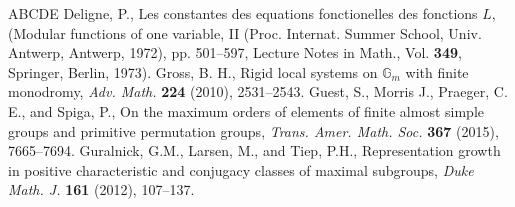 \documentclass[11pt]{amsart}
\theoremstyle{plain}
\theoremstyle{definition}
\numberwithin{thm}{section}
\numberwithin{equation}{thm}
\newcommand{\G}{{\mathbb G}}
\newcommand{\0}{\emptyset}
\begin{document}
\begin{thebibliography}{ABCDE}
\medskip
{}Deligne, P., Les constantes des equations fonctionelles des fonctions $L$, (Modular functions of one variable, II (Proc. Internat. Summer School, Univ. Antwerp, Antwerp, 1972), pp. 501--597, Lecture Notes in Math., Vol. {\bf 349}, Springer, Berlin, 1973).
\medskip
{}
Gross, B. H., Rigid local systems on $\G_m$ with finite monodromy, {\it  Adv. Math.} {\bf 224} (2010), 2531--2543.
\medskip
{}
  Guest, S., Morris J., Praeger, C. E., and Spiga, P., On the maximum orders of elements of finite almost simple groups and primitive permutation groups,
{\it Trans. Amer. Math. Soc.} {\bf 367} (2015), 7665--7694.
\medskip
{}
  Guralnick, G.M., Larsen, M., and Tiep, P.H., Representation growth in positive characteristic and conjugacy classes of maximal subgroups, {\it Duke Math. J.} {\bf 161} (2012), 107--137.

\end{thebibliography}
\end{document}
